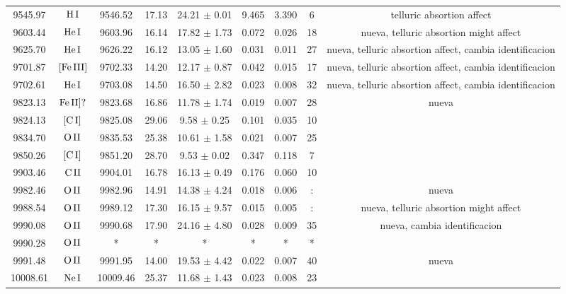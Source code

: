 \documentclass{article}
\begin{document}
\begin{table*}
\begin{adjustbox}{width=\textwidth}
\begin{tabular}{ccccccccc}
9545.97 & $\mbox{H}\thinspace \mbox{I}$ & 9546.52 & 17.13 & 24.21 $\pm$ 0.01 & 9.465 & 3.390 & 6 &  telluric absortion affect \\
9603.44 & $\mbox{He}\thinspace \mbox{I}$ & 9603.96 & 16.14 & 17.82 $\pm$ 1.73 & 0.072 & 0.026 & 18 &  nueva, telluric absortion might affect \\
9625.70 & $\mbox{He}\thinspace \mbox{I}$ & 9626.22 & 16.12 & 13.05 $\pm$ 1.60 & 0.031 & 0.011 & 27 &  nueva, telluric absortion affect, cambia identificacion \\
9701.87 & $\mbox{[Fe}\thinspace \mbox{III]}$ & 9702.33 & 14.20 & 12.17 $\pm$ 0.87 & 0.042 & 0.015 & 17 &  nueva, telluric absortion affect, cambia identificacion \\
9702.61 & $\mbox{He}\thinspace \mbox{I}$ & 9703.08 & 14.50 & 16.50 $\pm$ 2.82 & 0.023 & 0.008 & 32 &  nueva, telluric absortion affect, cambia identificacion \\
9823.13 & $\mbox{Fe}\thinspace \mbox{II]?}$ & 9823.68 & 16.86 & 11.78 $\pm$ 1.74 & 0.019 & 0.007 & 28 &  nueva \\
9824.13 & $\mbox{[C}\thinspace \mbox{I]}$ & 9825.08 & 29.06 & 9.58 $\pm$ 0.25 & 0.101 & 0.035 & 10 &  \\
9834.70 & $\mbox{O}\thinspace \mbox{II}$ & 9835.53 & 25.38 & 10.61 $\pm$ 1.58 & 0.021 & 0.007 & 25 &  \\
9850.26 & $\mbox{[C}\thinspace \mbox{I]}$ & 9851.20 & 28.70 & 9.53 $\pm$ 0.02 & 0.347 & 0.118 & 7 &  \\
9903.46 & $\mbox{C}\thinspace \mbox{II}$ & 9904.01 & 16.78 & 16.13 $\pm$ 0.49 & 0.176 & 0.060 & 10 &  \\
9982.46 & $\mbox{O}\thinspace \mbox{II}$ & 9982.96 & 14.91 & 14.38 $\pm$ 4.24 & 0.018 & 0.006 & : &  nueva \\
9988.54 & $\mbox{O}\thinspace \mbox{II}$ & 9989.12 & 17.30 & 16.15 $\pm$ 9.57 & 0.015 & 0.005 & : &  nueva, telluric absortion might affect \\
9990.08 & $\mbox{O}\thinspace \mbox{II}$ & 9990.68 & 17.90 & 24.16 $\pm$ 4.80 & 0.028 & 0.009 & 35 &  nueva, cambia identificacion \\
9990.28 & $\mbox{O}\thinspace \mbox{II}$ & * & * & * & * & * & * &  \\
9991.48 & $\mbox{O}\thinspace \mbox{II}$ & 9991.95 & 14.00 & 19.53 $\pm$ 4.42 & 0.022 & 0.007 & 40 &  nueva \\
10008.61 & $\mbox{Ne}\thinspace \mbox{I}$ & 10009.46 & 25.37 & 11.68 $\pm$ 1.43 & 0.023 & 0.008 & 23 &  \\

\end{tabular}
\end{adjustbox}
\end{table*}
\end{document}
